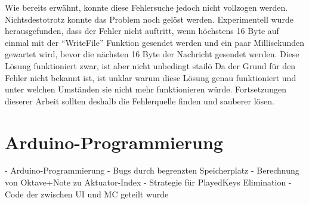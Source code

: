 Wie bereits erwähnt, konnte diese Fehlersuche jedoch nicht vollzogen werden.
Nichtsdestotrotz konnte das Problem noch gelöst werden.
Experimentell wurde herausgefunden, dass der Fehler nicht auftritt, wenn höchstens 16 Byte auf einmal mit der \enquote{WriteFile} Funktion gesendet werden und ein paar Millisekunden gewartet wird, bevor die nächsten 16 Byte der Nachricht gesendet werden.
Diese Lösung funktioniert zwar, ist aber nicht unbedingt stailö
Da der Grund für den Fehler nicht bekannt ist, ist unklar warum diese Lösung genau funktioniert und unter welchen Umständen sie nicht mehr funktionieren würde.
Fortsetzungen dieserer Arbeit sollten deshalb die Fehlerquelle finden und sauberer lösen.


\section{Arduino-Programmierung} \label{umsetzungSW-MC}

- Arduino-Programmierung \newline
	- Bugs durch begrenzten Speicherplatz \newline
	- Berechnung von Oktave+Note zu Aktuator-Index \newline
	- Strategie für PlayedKeys Elimination \newline
- Code der zwischen UI und MC geteilt wurde \newline

